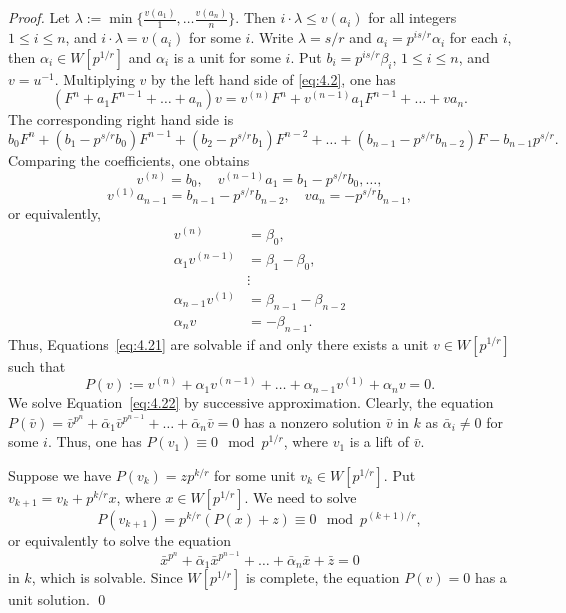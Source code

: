 \documentclass[10pt,a4paper]{amsart}
\begin{document}
\begin{proof}
    Let $\lambda:=\min \{\frac{v(a_1)}{1},\dots \frac{v(a_n)}{n} \}$. Then $i\cdot \lambda\le v(a_i)$ for all integers $1\le i \le n$, and $i\cdot \lambda=v(a_i)$ for some $i$. Write $\lambda=s/r$ and $a_i= p^{is/r} \alpha_i$ for each $i$, then $\alpha_i\in W[p^{1/r}]$ and $\alpha_i$ is a unit for some $i$. Put $b_i=p^{is/r} \beta_i$, $1\le i \le n$, and $v=u^{-1}$. Multiplying $v$ by the left hand side of \eqref{eq:4.2}, one has
    \[ (F^n+a_1 F^{n-1}+\dots +a_n)v=v^{(n)} F^n+v^{(n-1)} a_1 F^{n-1} +\dots+v a_n. \]
    The corresponding right hand side is  
    \[ b_0 F^n+(b_1-p^{s/r} b_0)F^{n-1}+(b_2-p^{s/r} b_1) F^{n-2}+ \dots + (b_{n-1}-p^{s/r} b_{n-2})F-b_{n-1} p^{s/r}. \]
    Comparing the coefficients, one obtains
    \[ v^{(n)}=b_0, \quad v^{(n-1)} a_1=b_1-p^{s/r} b_0,\dots, \]
    \[ v^{(1)} a_{n-1}=b_{n-1}-p^{s/r} b_{n-2}, \quad va_n=-p^{s/r} b_{n-1},\]
    or equivalently,
    \begin{equation} \label{eq:4.21}   
     \begin{split}
        v^{(n)} &=\beta_0,\\
        \alpha_1 v^{(n-1)}& =\beta_1-\beta_0,\\
           & \vdots \\
           \alpha_{n-1} v^{(1)}&=\beta_{n-1}-\beta_{n-2}\\
           \alpha_n v&=-\beta_{n-1}.
     \end{split}
     \end{equation}
Thus, Equations~\eqref{eq:4.21} are solvable if and only there exists a unit $v\in W[p^{1/r}]$ such that 
\begin{equation}\label{eq:4.22}
   P(v):=v^{(n)}+ \alpha_1 v^{(n-1)} +\dots+\alpha_{n-1}v^{(1)}+\alpha_n v=0. 
\end{equation}
We solve Equation~\eqref{eq:4.22} by successive approximation. Clearly, the equation 
$P(\bar v)=\bar v^{p^n}+\bar \alpha_1 \bar v^{p^{n-1}}+\dots +\bar \alpha_n \bar v=0$
has a nonzero solution $\bar v$ in $k$ as $\bar \alpha_i\neq 0$ for some $i$. Thus, one has $P(v_1)\equiv 0 \mod p^{1/r}$, where $v_1$ is a lift of $\bar v$.


Suppose we have $P(v_k)=z p^{k/r}$ for some unit $v_k\in W[p^{1/r}]$.
Put $v_{k+1}=v_k+p^{k/r}x$, where $x\in W[p^{1/r}]$. We need to solve
\[ P(v_{k+1})=p^{k/r}(P(x)+z) \equiv 0 \mod p^{(k+1)/r}, \]
or equivalently to solve the equation 
\[ \bar x^{p^n}+\bar \alpha_1 \bar x^{p^{n-1}}+\dots +\bar \alpha_n \bar x +\bar z=0\]
in $k$, which is solvable. Since $W[p^{1/r}]$ is complete, the equation $P(v)=0$ has a unit solution. \qed
\end{proof}
\end{document}
